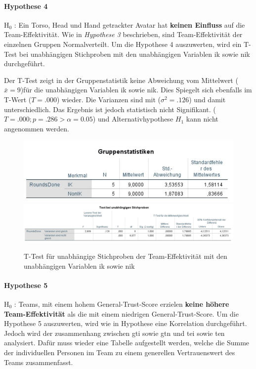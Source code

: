 \documentclass[a4paper,11pt]{article}%
\renewcommand{\\}{\vspace*{0.5\baselineskip} \newline}
\begin{document}
\newpage
\paragraph{Hypothese 4}
H$_{0}$ : Ein Torso, Head und Hand getrackter Avatar hat \textbf{keinen Einfluss} auf die Team-Effektivität.\\
Wie in \textit{Hypothese 3} beschrieben, sind Team-Effektivität der einzelnen Gruppen Normalverteilt.
Um die Hypothese 4 auszuwerten, wird ein T-Test bei unabhängigen Stichproben mit den unabhängigen Variablen \ac{ik} sowie \ac{nik} durchgeführt.

Der T-Test zeigt in der Gruppenstatistik keine Abweichung vom Mittelwert ($\bar{x} = 9$)für die unabhängigen Variablen \ac{ik} sowie \ac{nik}. Dies Spiegelt sich ebenfalls im T-Wert ($T = .000$) wieder. Die Varianzen sind mit ($\sigma^{2} = .126$) und damit unterschiedlich. Das Ergebnis ist jedoch statistisch nicht Signifikant. ($ T = .000 ; p = .286 > \alpha = 0.05$) und Alternativhypothese $H_{1}$ kann nicht angenommen werden.

\begin{figure}[H]
\centering
		\begin{footnotesize}
			\includegraphics[scale=0.8]{Abbildungen/Post_QuestionnaireStatistiks/h4_ttest}
			\includegraphics[scale=0.5]{Abbildungen/Post_QuestionnaireStatistiks/h4_ttest2}
			\caption{T-Test für unabhängige Stichproben der Team-Effektivität mit den unabhängigen Variablen \ac{ik} sowie \ac{nik}}
			\label{fig:h4_ttest}
		\end{footnotesize}
	\end{figure}	
	

\newpage
\paragraph{Hypothese 5}
H$_{0}$ : Teams, mit einem hohem General-Trust-Score erzielen \textbf{keine höhere Team-Effektivität} als die mit einem niedrigen General-Trust-Score.\\
Um die Hypothese 5 auszuwerten, wird wie in Hypothese eine Korrelation durchgeführt. Jedoch wird der 
zusammenhang zwischen \ac{gti} sowie \ac{gtn} und \ac{tei} sowie \ac{ten} analysiert. Dafür muss wieder eine Tabelle aufgestellt werden, welche die Summe der individuellen Personen im Team zu einem generellen Vertrauenswert des Teams zusammenfasst.
\end{document}
